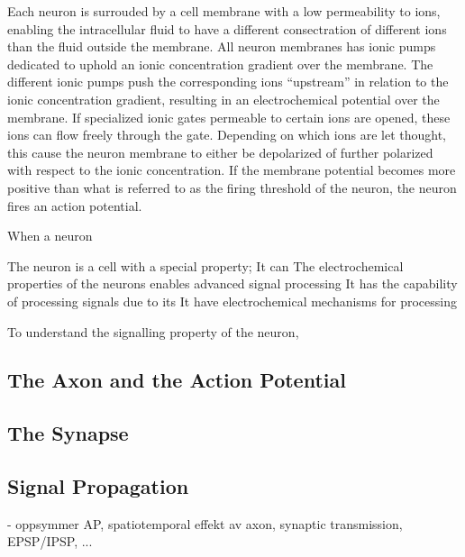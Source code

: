 		Each neuron is surrouded by a cell membrane with a low permeability to ions, enabling the intracellular fluid to have a different consectration of different ions than the fluid outside the membrane.
		All neuron membranes has ionic pumps dedicated to uphold an ionic concentration gradient over the membrane.
		The different ionic pumps push the corresponding ions ``upstream'' in relation to the ionic concentration gradient, resulting in an electrochemical potential over the membrane.
		If specialized ionic gates permeable to certain ions are opened, these ions can flow freely through the gate. %
		Depending on which ions are let thought, this cause the neuron membrane to either be depolarized of further polarized with respect to the ionic concentration.
		If the membrane potential becomes more positive than what is referred to as the firing threshold of the neuron, the neuron fires an action potential.

		When a neuron
	



		The neuron is a cell with a special property; It can
			The electrochemical properties of the neurons enables advanced signal processing
			It has the capability of processing signals due to its
			It have electrochemical mechanisms for processing 



	To understand the signalling property of the neuron, 

	\subsection{The Axon and the Action Potential}

	\subsection{The Synapse}

	\subsection{Signal Propagation}
		- oppsymmer AP, spatiotemporal effekt av axon, synaptic transmission, EPSP/IPSP, ...

